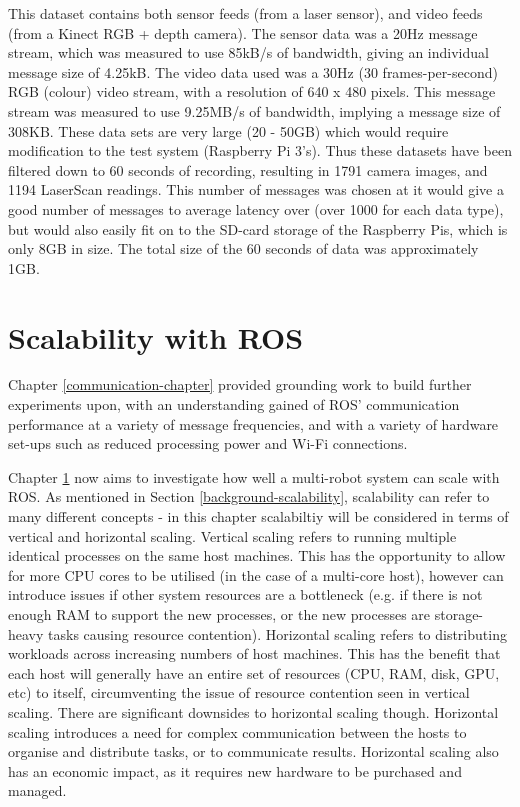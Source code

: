 \documentclass{l4proj}
\begin{document}
This dataset contains both sensor feeds (from a laser sensor), and video feeds (from a Kinect RGB + depth camera). The sensor data was a 20Hz message stream, which was measured to use 85kB/s of bandwidth, giving an individual message size of 4.25kB. The video data used was a 30Hz (30 frames-per-second) RGB (colour) video stream, with a resolution of 640 x 480 pixels. This message stream was measured to use 9.25MB/s of bandwidth, implying a message size of 308KB. These data sets are very large (20 - 50GB) which would require modification to the test system (Raspberry Pi 3’s). Thus these datasets have been filtered down to 60 seconds of recording, resulting in 1791 camera images, and 1194 LaserScan readings. This number of messages was chosen at it would give a good number of messages to average latency over (over 1000 for each data type), but would also easily fit on to the SD-card storage of the Raspberry Pis, which is only 8GB in size. The total size of the 60 seconds of data was approximately 1GB.





\chapter{Scalability with ROS}
\label{host-scalability-chapter}

Chapter \ref{communication-chapter} provided grounding work to build further experiments upon, with an understanding gained of ROS' communication performance at a variety of message frequencies, and with a variety of hardware set-ups such as reduced processing power and Wi-Fi connections.

Chapter \ref{host-scalability-chapter} now aims to investigate how well a multi-robot system can scale with ROS. As mentioned in Section \ref{background-scalability}, scalability can refer to many different concepts - in this chapter scalabiltiy will be considered in terms of vertical and horizontal scaling. Vertical scaling refers to running multiple identical processes on the same host machines. This has the opportunity to allow for more CPU cores to be utilised (in the case of a multi-core host), however can introduce issues if other system resources are a bottleneck (e.g. if there is not enough RAM to support the new processes, or the new processes are storage-heavy tasks causing resource contention). Horizontal scaling refers to distributing workloads across increasing numbers of host machines. This has the benefit that each host will generally have an entire set of resources (CPU, RAM, disk, GPU, etc) to itself, circumventing the issue of resource contention seen in vertical scaling. There are significant downsides to horizontal scaling though. Horizontal scaling introduces a need for complex communication between the hosts to organise and distribute tasks, or to communicate results. Horizontal scaling also has an economic impact, as it requires new hardware to be purchased and managed.
\end{document}
